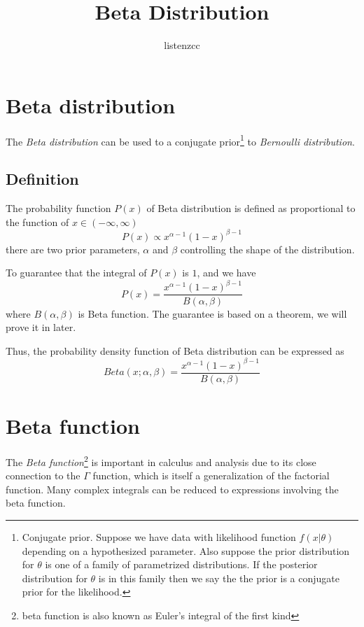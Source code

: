 \documentclass[a4paper]{article}
\title{Beta Distribution}
\author{listenzcc}
\begin{document}
\maketitle

\section{Beta distribution}
The \emph{Beta distribution} can be used to a conjugate prior\footnote{Conjugate prior. Suppose we have data with likelihood function $f(x|\theta)$ depending on a hypothesized parameter. Also suppose the prior distribution for $\theta$ is one of a family of parametrized distributions. If the posterior distribution for $\theta$ is in this family then we say the the prior is a conjugate prior for the likelihood.} to \emph{Bernoulli distribution}.

\subsection{Definition}
The probability function $P(x)$ of Beta distribution is defined as proportional to the function of $x \in (-\infty, \infty)$
\begin{equation}
    P(x) \propto x^{\alpha-1} (1-x)^{\beta-1}
\end{equation}
there are two prior parameters, $\alpha$ and $\beta$ controlling the shape of the distribution.

To guarantee that the integral of $P(x)$ is $1$, and we have
\begin{equation}
    P(x) = \frac{x^{\alpha-1} (1-x)^{\beta-1}}{B(\alpha, \beta)}
\end{equation}
where $B(\alpha, \beta)$ is Beta function.
The guarantee is based on a theorem, we will prove it in later.

Thus, the probability density function of Beta distribution can be expressed as
\begin{equation}
    Beta(x; \alpha, \beta) = \frac{x^{\alpha-1} (1-x)^{\beta-1}}{B(\alpha, \beta)}
\end{equation}

\section{Beta function}
The \emph{Beta function}\footnote{beta function is also known as Euler's integral of the first kind} is important in calculus and analysis due to its close connection to the $\Gamma$ function, which is itself a generalization of the factorial function.
Many complex integrals can be reduced to expressions involving the beta function.
\end{document}
